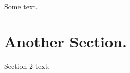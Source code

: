 Some text. \hypertarget{item2_item3}{}\section{Another Section.}\label{item2_item3}
Section 2 text. 
